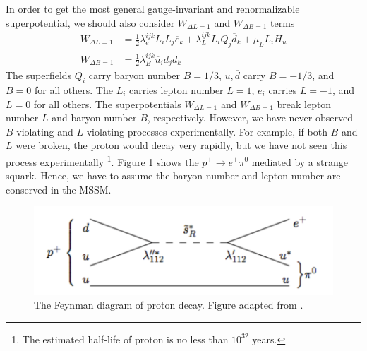 \documentclass[12pt]{report}
\begin{document}
In order to get the most general gauge-invariant and renormalizable  superpotential, we should also consider $W_{\Delta L = 1}$ and $W_{\Delta B = 1}$ terms
\begin{align}
W_{\Delta L = 1} &= \frac{1}{2} \lambda^{ijk}_{e} L_{i} L_{j} \overline{e}_{k} + \lambda^{ijk}_{L} L_{i} Q_{j} \overline{d}_{k} + \mu_{L} L_{i} H_{u} \label{eq: superpotential violate L}\\
W_{\Delta B = 1} &= \frac{1}{2} \lambda^{ijk}_{B} \overline{u}_{i} \overline{d}_{j} \overline{d}_{k} \label{eq: superpotential violate B}
\end{align}
The superfields $Q_{i}$ carry baryon number $B = 1/3$, $\overline{u}, \overline{d}$ carry $B = -1/3$, and $B = 0$ for all others.
The $L_{i}$ carries lepton number $L = 1$, $\overline{e}_{i}$ carries $L = -1$, and $L = 0$ for all others.
The superpotentials $W_{\Delta L = 1}$ and $W_{\Delta B = 1}$  break lepton number $L$ and baryon number $B$, respectively.
However, we have never observed $B$-violating and $L$-violating processes experimentally.
For example, if both $B$ and $L$ were broken, the proton would decay very rapidly, but we have not seen this process experimentally \footnote{The estimated half-life of proton is no less than $10^{32}$ years.}.
Figure \ref{fig: proton decay} shows the $p^{+} \to e^{+} \pi^{0}$ mediated by a strange squark.
Hence, we have to assume the baryon number and lepton number are conserved in the MSSM.
\begin{figure}[htbp]
\begin{center}
\includegraphics[scale=0.6]{figures/proton_decay.pdf}
\caption{The Feynman diagram of proton decay. Figure adapted from \cite{Martin}.}
\label{fig: proton decay}
\end{center}
\end{figure}
\end{document}
